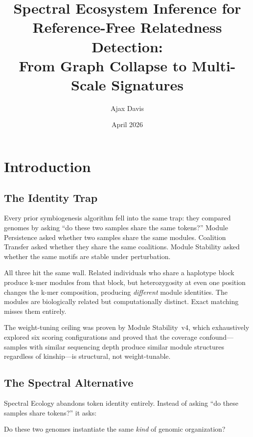 \documentclass{../yalumba}
\title{Spectral Ecosystem Inference for\\Reference-Free Relatedness Detection:\\From Graph Collapse to Multi-Scale Signatures}
\author{Ajax Davis}
\date{April 2026}
\begin{document}
\maketitle

\tableofcontents
\newpage


\section{Introduction}
\label{sec:intro}

\subsection{The Identity Trap}

Every prior symbiogenesis algorithm fell into the same trap: they compared
genomes by asking ``do these two samples share the same tokens?''  Module
Persistence asked whether two samples share the same modules.  Coalition
Transfer asked whether they share the same coalitions.  Module Stability
asked whether the same motifs are stable under perturbation.


All three hit the same wall.  Related individuals who share a haplotype block
produce k-mer modules from that block, but heterozygosity at even one position
changes the k-mer composition, producing \emph{different} module identities.
The modules are biologically related but computationally distinct.  Exact
matching misses them entirely.

The weight-tuning ceiling was proven by Module Stability~v4, which
exhaustively explored six scoring configurations and proved that the coverage
confound---samples with similar sequencing depth produce similar module
structures regardless of kinship---is structural, not weight-tunable.

\subsection{The Spectral Alternative}

Spectral Ecology abandons token identity entirely.  Instead of asking ``do
these samples share tokens?'' it asks:

\begin{pullquote}
Do these two genomes instantiate the same \emph{kind} of genomic organization?
\end{pullquote}
\end{document}
